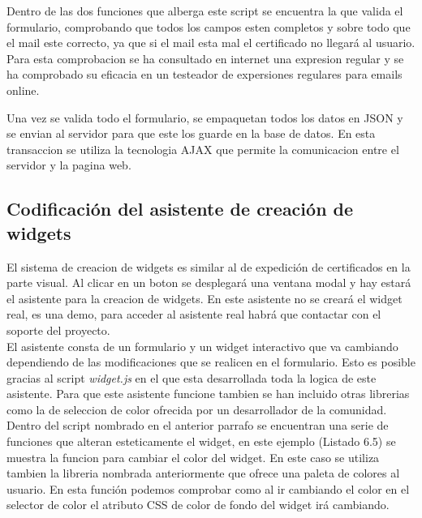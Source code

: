 Dentro de las dos funciones que alberga este script se encuentra la que valida el formulario, comprobando que todos los campos esten completos y sobre todo que el mail este correcto, ya que si el mail esta mal el certificado no llegará al usuario. Para esta comprobacion se ha consultado en internet una expresion regular y se ha comprobado su eficacia en un testeador de expersiones regulares para emails online. \\


Una vez se valida todo el formulario, se empaquetan todos los datos en JSON y se envian al servidor para que este los guarde en la base de datos. En esta transaccion se utiliza la tecnologia AJAX\cite{wsdl14} que permite la comunicacion entre el servidor y la pagina web.\\


\subsection{Codificación del asistente de creación de widgets}
El sistema de creacion de widgets es similar al de expedición de certificados en la parte visual. Al clicar en un boton se desplegará una ventana modal y hay estará el asistente para la creacion de widgets. En este asistente no se creará el widget real, es una demo, para acceder al asistente real habrá que contactar con el soporte del proyecto.\\

El asistente consta de un formulario y un widget interactivo que va cambiando dependiendo de las modificaciones que se realicen en el formulario. Esto es posible gracias al script \textit{widget.js} en el que esta desarrollada toda la logica de este asistente. Para que este asistente funcione tambien se han incluido otras librerias como la de seleccion de color\cite{wsdl15} ofrecida por un desarrollador de la comunidad.\\

Dentro del script nombrado en el anterior parrafo se encuentran una serie de funciones que alteran esteticamente el widget, en este ejemplo (Listado 6.5) se muestra la funcion para cambiar el color del widget. En este caso se utiliza tambien la libreria nombrada anteriormente que ofrece una paleta de colores al usuario.  En esta función podemos comprobar como al ir cambiando el color en el selector de color el atributo CSS de color de fondo del widget irá cambiando.\\

